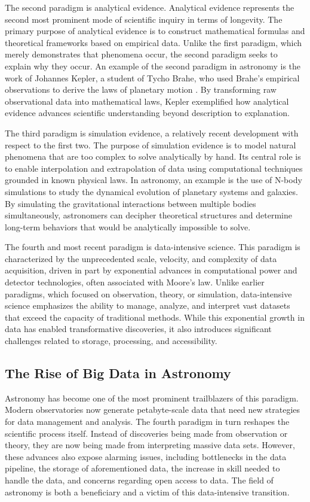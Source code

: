 \documentclass[preprint2,linenumbers, longauthor]{aastex631}
\begin{document}
The second paradigm is analytical evidence. Analytical evidence represents the second most prominent mode of scientific inquiry in terms of longevity. 
The primary purpose of analytical evidence is to construct mathematical formulas and theoretical frameworks based on empirical data. 
Unlike the first paradigm, which merely demonstrates that phenomena occur, the second paradigm seeks to explain why they occur. 
An example of the second paradigm in astronomy is the work of Johannes Kepler, a student of Tycho Brahe, who used Brahe's empirical observations to derive the laws of planetary motion \citep{heyFourthParadigmDataIntensive2009}. 
By transforming raw observational data into mathematical laws, Kepler exemplified how analytical evidence advances scientific understanding beyond description to explanation.

The third paradigm is simulation evidence, a relatively recent development with respect to the first two. The purpose of simulation evidence is to model natural phenomena that are too complex to solve analytically by hand. 
Its central role is to enable interpolation and extrapolation of data using computational techniques grounded in known physical laws. 
In astronomy, an example is the use of N-body simulations to study the dynamical evolution of planetary systems and galaxies. 
By simulating the gravitational interactions between multiple bodies simultaneously, astronomers can decipher theoretical structures and determine long-term behaviors that would be analytically impossible to solve.

The fourth and most recent paradigm is data-intensive science. 
This paradigm is characterized by the unprecedented scale, velocity, and complexity of data acquisition, driven in part by exponential advances in computational power and detector technologies, often associated with Moore's law. 
Unlike earlier paradigms, which focused on observation, theory, or simulation, data-intensive science emphasizes the ability to manage, analyze, and interpret vast datasets that exceed the capacity of traditional methods. 
While this exponential growth in data has enabled transformative discoveries, it also introduces significant challenges related to storage, processing, and accessibility. 

\subsection{The Rise of Big Data in Astronomy}
Astronomy has become one of the most prominent trailblazers of this paradigm. Modern observatories now generate petabyte-scale data that need new strategies for data management and analysis. 
The fourth paradigm in turn reshapes the scientific process itself. Instead of discoveries being made from observation or theory, they are now being made from interpreting massive data sets. 
However, these advances also expose alarming issues, including bottlenecks in the data pipeline, the storage of aforementioned data, the increase in skill needed to handle the data, and concerns regarding open access to data. 
The field of astronomy is both a beneficiary and a victim of this data-intensive transition. 
\end{document}

